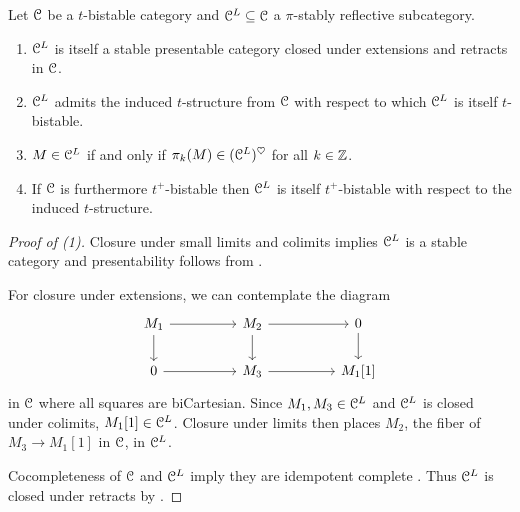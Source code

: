 \begin{proposition}\label{prop: properties of pi stably reflective localizations}
    Let $\EuScript{C}$ be a $t$-bistable category and $\EuScript{C}^{L}\subseteq\EuScript{C}$ a $\pi$-stably reflective subcategory. 
    \begin{enumerate}
        \item $\EuScript{C}^{L}$ is itself a stable presentable category closed under extensions and retracts in $\EuScript{C}$. 
        \item $\EuScript{C}^{L}$ admits the induced $t$-structure from $\EuScript{C}$ with respect to which $\EuScript{C}^{L}$ is itself $t$-bistable. 
        \item $M\in\EuScript{C}^{L}$ if and only if $\pi_{k}(M)\in(\EuScript{C}^{L})^{\heartsuit}$ for all $k\in\mathbb{Z}$. 
        \item If $\EuScript{C}$ is furthermore $t^{+}$-bistable then $\EuScript{C}^{L}$ is itself $t^{+}$-bistable with respect to the induced $t$-structure. 
    \end{enumerate}
\end{proposition}
\begin{proof}[Proof of (1)]
    Closure under small limits and colimits implies $\EuScript{C}^{L}$ is a stable category \cite[Lem. 1.1.3.3]{HA} and presentability follows from \cite[Thm. 1.1]{RagimovReflection}. 

    For closure under extensions, we can contemplate the diagram 
    \begin{equation}\label{eqn: closed under extensions diagram}
        \begin{tikzcd}
            {M_{1}} && {M_{2}} && 0 \\
            0 && {M_{3}} && {M_{1}[1]}
            \arrow[from=1-1, to=1-3]
            \arrow[from=1-1, to=2-1]
            \arrow[from=1-3, to=1-5]
            \arrow[from=1-3, to=2-3]
            \arrow[from=1-5, to=2-5]
            \arrow[from=2-1, to=2-3]
            \arrow[from=2-3, to=2-5]
        \end{tikzcd}
    \end{equation}
    in $\EuScript{C}$ where all squares are biCartesian. Since $M_{1},M_{3}\in\EuScript{C}^{L}$ and $\EuScript{C}^{L}$ is closed under colimits, $M_{1}[1]\in\EuScript{C}^{L}$. Closure under limits then places $M_{2}$, the fiber of $M_{3}\to M_{1}[1]$ in $\EuScript{C}$, in $\EuScript{C}^{L}$.

    Cocompleteness of $\EuScript{C}$ and $\EuScript{C}^{L}$ imply they are idempotent complete \cite[Rmk. 4.4.5.3 \& Cor. 4.4.5.15]{HTT}. Thus $\EuScript{C}^{L}$ is closed under retracts by . 
\end{proof}

